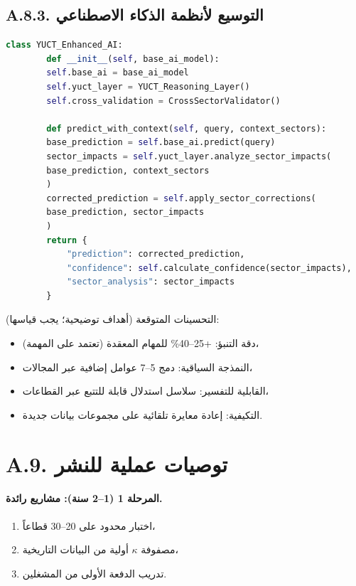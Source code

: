 \documentclass[13pt,a4paper]{article}
\begin{document}
	\subsection*{A.8.3. التوسيع لأنظمة الذكاء الاصطناعي}
	
	\begin{lstlisting}[language=Python]
		class YUCT_Enhanced_AI:
		def __init__(self, base_ai_model):
		self.base_ai = base_ai_model
		self.yuct_layer = YUCT_Reasoning_Layer()
		self.cross_validation = CrossSectorValidator()
		
		def predict_with_context(self, query, context_sectors):
		base_prediction = self.base_ai.predict(query)
		sector_impacts = self.yuct_layer.analyze_sector_impacts(
		base_prediction, context_sectors
		)
		corrected_prediction = self.apply_sector_corrections(
		base_prediction, sector_impacts
		)
		return {
			"prediction": corrected_prediction,
			"confidence": self.calculate_confidence(sector_impacts),
			"sector_analysis": sector_impacts
		}
	\end{lstlisting}
	
	التحسينات المتوقعة (أهداف توضيحية؛ يجب قياسها):
	\begin{itemize}[leftmargin=*]
		\item دقة التنبؤ: +25--40\% للمهام المعقدة (تعتمد على المهمة)،
		\item النمذجة السياقية: دمج 5--7 عوامل إضافية عبر المجالات،
		\item القابلية للتفسير: سلاسل استدلال قابلة للتتبع عبر القطاعات،
		\item التكيفية: إعادة معايرة تلقائية على مجموعات بيانات جديدة.
	\end{itemize}
	
	\section*{A.9. توصيات عملية للنشر}
	
	\paragraph{المرحلة 1 (1--2 سنة): مشاريع رائدة.}
	\begin{enumerate}[leftmargin=*]
		\item اختبار محدود على 20--30 قطاعاً،
		\item مصفوفة $\kappa$ أولية من البيانات التاريخية،
		\item تدريب الدفعة الأولى من المشغلين.
	\end{enumerate}
	
\end{document}

